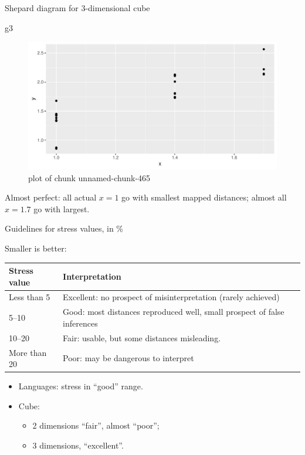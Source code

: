 \documentclass[ignorenonframetext,]{beamer}
\newenvironment{Shaded}{\begin{snugshade}}{\end{snugshade}}
\newcommand{\NormalTok}[1]{#1}
\begin{document}
\begin{frame}[fragile]{Shepard diagram for 3-dimensional cube}
\protect\hypertarget{shepard-diagram-for-3-dimensional-cube}{}

\begin{Shaded}
\begin{Highlighting}[]
\NormalTok{g3}
\end{Highlighting}
\end{Shaded}

\begin{figure}
\centering
\includegraphics{figure/unnamed-chunk-465-1.pdf}
\caption{plot of chunk unnamed-chunk-465}
\end{figure}

Almost perfect: all actual \(x=1\) go with smallest mapped distances;
almost all \(x=1.7\) go with largest.

\end{frame}

\begin{frame}{Guidelines for stress values, in \%}
\protect\hypertarget{guidelines-for-stress-values-in}{}

Smaller is better:

\begin{tabular}{lp{3in}}
Stress value & Interpretation \\
\hline
Less than 5 & Excellent: no prospect of misinterpretation (rarely achieved)\\
5--10 & Good: most distances reproduced well, small prospect of false inferences\\
10--20 & Fair: usable, but some distances misleading.\\
More than 20 & Poor: may be dangerous to interpret\\
\hline
\end{tabular}

\begin{itemize}
\item
  Languages: stress in ``good'' range.
\item
  Cube:

  \begin{itemize}
  \item
    2 dimensions ``fair'', almost ``poor'';
  \item
    3 dimensions, ``excellent''.
  \end{itemize}
\end{itemize}

\end{frame}
\end{document}
